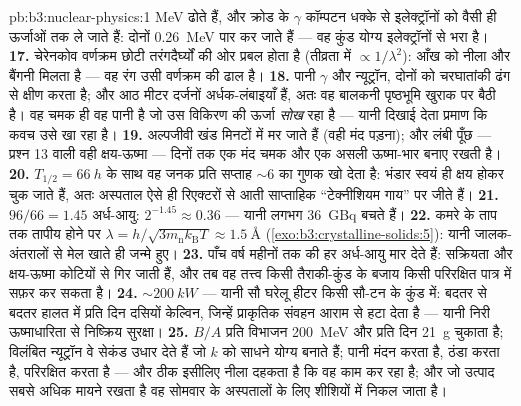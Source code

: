 \begin{solution}{pb:b3:nuclear-physics:1}
\unit{MeV} ढोते हैं, और क्रोड के $\gamma$ कॉम्पटन धक्के से
इलेक्ट्रॉनों को वैसी ही ऊर्जाओं तक ले जाते हैं: दोनों
\qty{0.26}{MeV} पार कर जाते हैं --- वह कुंड योग्य इलेक्ट्रॉनों से
भरा है।
\textbf{17.} चेरेनकोव वर्णक्रम छोटी तरंगदैर्घ्यों की ओर प्रबल होता
है (तीव्रता में $\propto1/\lambda^2$): आँख को नीला और बैंगनी मिलता
है --- वह रंग उसी वर्णक्रम की ढाल है।
\textbf{18.} पानी $\gamma$ और न्यूट्रॉन, दोनों को चरघातांकी ढंग से
क्षीण करता है; और आठ मीटर दर्जनों अर्धक-लंबाइयाँ हैं, अतः
वह बालकनी पृष्ठभूमि खुराक पर बैठी है। वह चमक ही वह पानी है जो उस
विकिरण की ऊर्जा \emph{सोख} रहा है --- यानी दिखाई देता प्रमाण कि
कवच उसे खा रहा है।
\textbf{19.} अल्पजीवी खंड मिनटों में मर जाते हैं
(वही मंद पड़ना); और लंबी पूँछ --- प्रश्न 13 वाली वही क्षय-ऊष्मा ---
दिनों तक एक मंद चमक और एक असली ऊष्मा-भार बनाए रखती है।
\textbf{20.} $T_{1/2} = \qty{66}{h}$ के साथ वह जनक प्रति सप्ताह
${\sim}6$ का गुणक खो देता है: भंडार स्वयं ही क्षय होकर चुक जाते हैं,
अतः अस्पताल ऐसे ही रिएक्टरों से आती साप्ताहिक ``टेक्नीशियम गाय'' पर
जीते हैं।
\textbf{21.} $96/66 = 1.45$ अर्ध-आयु: $2^{-1.45} \approx
0.36$ --- यानी लगभग \qty{36}{GBq} बचते हैं।
\textbf{22.} कमरे के ताप तक तापीय होने पर $\lambda =
h/\sqrt{3m_{\text{n}}k_{\text{B}}T} \approx \qty{1.5}{\angstrom}$
(\cref{exo:b3:crystalline-solids:5}): यानी जालक-अंतरालों से
मेल खाते ही जन्मे हुए।
\textbf{23.} पाँच वर्ष महीनों तक की हर अर्ध-आयु मार देते हैं:
सक्रियता और क्षय-ऊष्मा कोटियों से गिर जाती हैं, और तब वह
तत्त्व किसी तैराकी-कुंड के बजाय किसी परिरक्षित पात्र में सफ़र कर सकता है।
\textbf{24.} ${\sim}\qty{200}{kW}$ --- यानी सौ घरेलू
हीटर किसी सौ-टन के कुंड में: बदतर से बदतर हालत में प्रति दिन दसियों
केल्विन, जिन्हें प्राकृतिक संवहन आराम से हटा देता है --- यानी निरी
ऊष्माधारिता से निष्क्रिय सुरक्षा।
\textbf{25.} $B/A$ प्रति विभाजन \qty{200}{MeV} और प्रति दिन
\qty{21}{g} चुकाता है; विलंबित न्यूट्रॉन वे सेकंड उधार देते हैं जो
$k$ को साधने योग्य बनाते हैं; पानी मंदन करता है, ठंडा करता है,
परिरक्षित करता है --- और ठीक इसीलिए नीला दहकता है कि वह काम कर रहा
है; और जो उत्पाद सबसे अधिक मायने रखता है वह सोमवार के अस्पतालों के
लिए शीशियों में निकल जाता है।
\end{solution}
